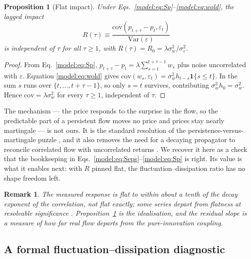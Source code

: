 \documentclass[aps,pre,twocolumn,superscriptaddress,floatfix,nofootinbib]{revtex4-2}
\newcommand{\eps}{\varepsilon}
\newcommand{\Var}{\mathrm{Var}}
\newtheorem{proposition}{Proposition}
\newtheorem{remark}{Remark}
\begin{document}
\begin{proposition}[Flat impact]
\label{model:prop:flat}
Under Eqs.~\eqref{model:eq:Sp}--\eqref{model:eq:wold}, the lagged impact
\begin{equation}
  R(\tau)\equiv\frac{\mathrm{cov}(p_{t+\tau}-p_t,\eps_t)}{\Var(\eps)}
\end{equation}
is independent of $\tau$ for all $\tau\ge1$, with
$R(\tau)=R_0=\lambda\sigma_w^2/\sigma_\eps^2$.
\end{proposition}

\begin{proof}
From Eq.~\eqref{model:eq:Sp}, $p_{t+\tau}-p_t=\lambda\sum_{s=t}^{t+\tau-1}w_s$ plus
noise uncorrelated with $\eps$. Equation \eqref{model:eq:wold} gives
$\mathrm{cov}(w_s,\eps_t)=\sigma_w^2h_{t-s}\mathbf1\{s\le t\}$. In the sum $s$
runs over $\{t,\dots,t+\tau-1\}$, so only $s=t$ survives, contributing
$\sigma_w^2h_0=\sigma_w^2$. Hence $\mathrm{cov}=\lambda\sigma_w^2$ for every
$\tau\ge1$, independent of $\tau$.
\end{proof}

The mechanism --- the price responds to the surprise in the flow, so the
predictable part of a persistent flow moves no price and prices stay nearly
martingale --- is not ours. It is the standard resolution of the
persistence-versus-martingale puzzle \cite{gerig2008,jaisson2014,muhlekarbe2026},
and it also removes the need for a decaying propagator to reconcile correlated
flow with uncorrelated returns \cite{bouchaud2004,bouchaud2018}. We recover it
here as a check that the bookkeeping in Eqs.~\eqref{model:eq:Seps}--\eqref{model:eq:Sp} is
right. Its value is what it enables next: with $R$ pinned flat, the
fluctuation--dissipation ratio has no shape freedom left.

\begin{remark}
The measured response is flat to within about a tenth of the decay exponent of
the correlation, not flat exactly; some series depart from flatness at
resolvable significance \cite{code_keldysh_finance}. Proposition~\ref{model:prop:flat} is the
idealisation, and the residual slope is a measure of how far real flow departs
from the pure-innovation coupling.
\end{remark}

\subsection{A formal fluctuation--dissipation diagnostic}
\label{model:sec:teff}
\end{document}
